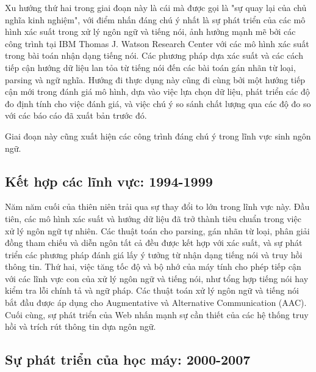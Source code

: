 Xu hướng thứ hai trong giai đoạn này là cái mà được gọi là "sự quay lại của chủ nghĩa kinh nghiệm", với điểm nhấn đáng chú ý nhất là sự phát triển của các mô hình xác suất trong xử lý ngôn ngữ và tiếng nói, ảnh hưởng mạnh mẽ bởi các công trình tại IBM Thomas J. Watson Research Center với các mô hình xác suất trong bài toán nhận dạng tiếng nói. Các phương pháp dựa xác suất và các cách tiếp cận hướng dữ liệu lan tỏa từ tiếng nói đến các bài toán gán nhãn từ loại, parsing và ngữ nghĩa. Hướng đi thực dụng này cũng đi cùng bởi một hướng tiếp cận mới trong đánh giá mô hình, dựa vào việc lựa chọn dữ liệu, phát triển các độ đo định tính cho việc đánh giá, và việc chú ý so sánh chất lượng qua các độ đo so với các báo cáo đã xuất bản trước đó.

Giai đoạn này cũng xuất hiện các công trình đáng chú ý trong lĩnh vực sinh ngôn ngữ.

\subsection{Kết hợp các lĩnh vực: 1994-1999}

Năm năm cuối của thiên niên trải qua sự thay đổi to lớn trong lĩnh vực này. Đầu tiên, các mô hình xác suất và hướng dữ liệu đã trở thành tiêu chuẩn trong việc xử lý ngôn ngữ tự nhiên. Các thuật toán cho parsing, gán nhãn từ loại, phân giải đồng tham chiếu và diễn ngôn tất cả đều được kết hợp với xác suất, và sự phát triển các phương pháp đánh giá lấy ý tưởng từ nhận dạng tiếng nói và truy hồi thông tin. Thứ hai, việc tăng tốc độ và bộ nhớ của máy tính cho phép tiếp cận với các lĩnh vực con của xử lý ngôn ngữ và tiếng nói, như tổng hợp tiếng nói hay kiểm tra lỗi chính tả và ngữ pháp. Các thuật toán xử lý ngôn ngữ và tiếng nói bắt đầu được áp dụng cho Augmentative và Alternative Communication (AAC). Cuối cùng, sự phát triển của Web nhấn mạnh sự cần thiết của các hệ thống truy hồi và trích rút thông tin dựa ngôn ngữ.

\subsection{Sự phát triển của học máy: 2000-2007}

